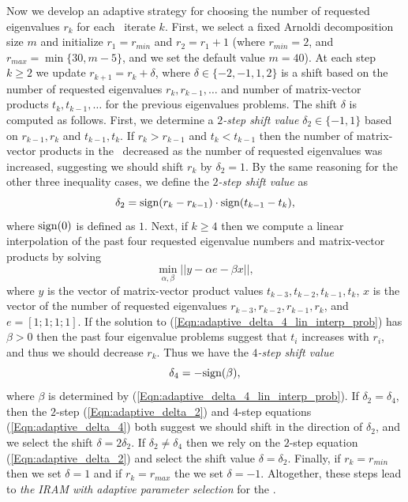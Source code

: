 Now we develop an adaptive strategy for choosing the number of requested eigenvalues $r_k$ for each \emep \ iterate $k$.
First, we select a fixed Arnoldi decomposition size $m$ and initialize $r_1=r_{min}$ and $r_2 = r_1+1$ (where $r_{min}=2$, and $r_{max} = \min\{ 30, m-5 \}$, and we set the default value $m=40$).  
At each step $k \geq 2$ we update $r_{k+1} =  r_k + \delta$, where $\delta \in \{-2, -1, 1, 2\}$ is a shift based on the number of requested eigenvalues $r_k, r_{k-1}, \ldots$ and number of matrix-vector products $t_k, t_{k-1}, \ldots$ for the previous eigenvalues problems.
The shift $\delta$ is computed as follows.
First, we determine a \textit{$2$-step shift value} $\delta_2 \in \{-1, 1\}$ based on $r_{k-1}, r_k$ and $t_{k-1}, t_k$.
If $r_k > r_{k-1}$ and $t_k < t_{k-1}$ then the number of matrix-vector products in the \emep \ decreased as the number of requested eigenvalues was increased, suggesting we should shift $r_k$ by $\delta_2 = 1$.
By the same reasoning for the other three inequality cases, we define the
\textit{$2$-step shift value} as
\begin{equation}				\label{Eqn:adaptive_delta_2}
\delta_2 = \textnormal{sign}(r_k - r_{k-1}) \cdot \textnormal{sign}(t_{k-1} - t_k),
\end{equation}
where $\textnormal{sign}(0)$ is defined as $1$.
Next, if $k \geq 4$ then we compute a linear interpolation of the past four requested eigenvalue numbers and matrix-vector products by solving
\begin{equation} 			\label{Eqn:adaptive_delta_4_lin_interp_prob}
\min_{\alpha, \beta} || y - \alpha e - \beta x ||,
\end{equation}
where $y$ is the vector of matrix-vector product values $t_{k-3}, t_{k-2}, t_{k-1}, t_k$, $x$ is the vector of the number of requested eigenvalues $r_{k-3}, r_{k-2}, r_{k-1}, r_k$, and $e = [1;1;1;1]$.
If the solution to (\ref{Eqn:adaptive_delta_4_lin_interp_prob}) has $\beta > 0$ then the past four eigenvalue problems suggest that $t_i$ increases with $r_i$, and thus we should decrease $r_k$.
Thus we have the \textit{$4$-step shift value}
\begin{equation}			\label{Eqn:adaptive_delta_4}
\delta_4 = -\textnormal{sign}(\beta),
\end{equation}
where $\beta$ is determined by (\ref{Eqn:adaptive_delta_4_lin_interp_prob}).
If $\delta_2 = \delta_4$, then the $2$-step (\ref{Eqn:adaptive_delta_2}) and $4$-step equations (\ref{Eqn:adaptive_delta_4}) both suggest we should shift in the direction of $\delta_2$, and we select the shift $\delta = 2\delta_2$.
If $\delta_2 \neq \delta_4$ then we rely on the $2$-step equation (\ref{Eqn:adaptive_delta_2}) and select the shift value $\delta = \delta_2$.
Finally, if $r_k = r_{min}$ then we set $\delta = 1$ and if $r_k = r_{max}$ the we set $\delta = -1$.
Altogether, these steps lead to \textit{the IRAM with adaptive parameter selection} for the \emep.



